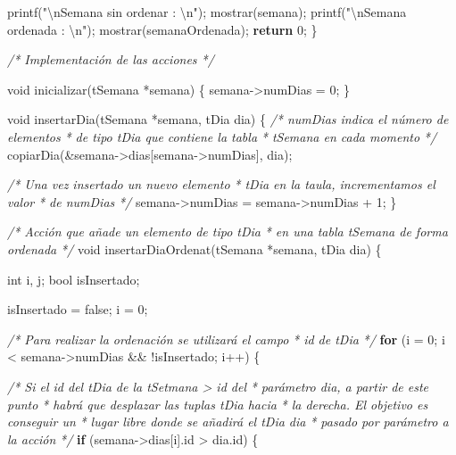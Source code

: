 \documentclass[
]{book}
\newenvironment{Shaded}{\begin{snugshade}}{\end{snugshade}}
\newcommand{\CommentTok}[1]{\textcolor[rgb]{0.56,0.35,0.01}{\textit{#1}}}
\newcommand{\ControlFlowTok}[1]{\textcolor[rgb]{0.13,0.29,0.53}{\textbf{#1}}}
\newcommand{\DataTypeTok}[1]{\textcolor[rgb]{0.13,0.29,0.53}{#1}}
\newcommand{\DecValTok}[1]{\textcolor[rgb]{0.00,0.00,0.81}{#1}}
\newcommand{\NormalTok}[1]{#1}
\newcommand{\SpecialCharTok}[1]{\textcolor[rgb]{0.00,0.00,0.00}{#1}}
\newcommand{\StringTok}[1]{\textcolor[rgb]{0.31,0.60,0.02}{#1}}
\begin{document}
\begin{Shaded}
\begin{Highlighting}[]
\NormalTok{    printf(}\StringTok{"}\SpecialCharTok{\textbackslash{}n}\StringTok{Semana sin ordenar : }\SpecialCharTok{\textbackslash{}n}\StringTok{"}\NormalTok{);}
\NormalTok{    mostrar(semana);}
\NormalTok{    printf(}\StringTok{"}\SpecialCharTok{\textbackslash{}n}\StringTok{Semana ordenada : }\SpecialCharTok{\textbackslash{}n}\StringTok{"}\NormalTok{);}
\NormalTok{    mostrar(semanaOrdenada);}
    \ControlFlowTok{return} \DecValTok{0}\NormalTok{;}
\NormalTok{\}}

\CommentTok{/* Implementación de las acciones */}

\DataTypeTok{void}\NormalTok{ inicializar(tSemana *semana) \{}
\NormalTok{    semana{-}\textgreater{}numDias = }\DecValTok{0}\NormalTok{;}
\NormalTok{\}}

\DataTypeTok{void}\NormalTok{ insertarDia(tSemana *semana, tDia dia) \{}
    \CommentTok{/* numDias indica el número de elementos}
\CommentTok{     * de tipo tDia que contiene la tabla }
\CommentTok{     * tSemana en cada momento }
\CommentTok{     */}
\NormalTok{    copiarDia(\&semana{-}\textgreater{}dias[semana{-}\textgreater{}numDias], dia);}

    \CommentTok{/* Una vez insertado un nuevo elemento}
\CommentTok{     * tDia en la taula, incrementamos el valor }
\CommentTok{     * de numDias }
\CommentTok{     */}
\NormalTok{    semana{-}\textgreater{}numDias = semana{-}\textgreater{}numDias + }\DecValTok{1}\NormalTok{;}
\NormalTok{\}}

\CommentTok{/* Acción que añade un elemento de tipo tDia}
\CommentTok{ * en una tabla tSemana de forma ordenada }
\CommentTok{ */}
\DataTypeTok{void}\NormalTok{ insertarDiaOrdenat(tSemana *semana, tDia dia) \{}
    
    \DataTypeTok{int}\NormalTok{ i, j;}
    \DataTypeTok{bool}\NormalTok{ isInsertado;}
    
\NormalTok{    isInsertado = false;}
\NormalTok{    i = }\DecValTok{0}\NormalTok{;}
    
    \CommentTok{/* Para realizar la ordenación se utilizará el campo}
\CommentTok{     * id de tDia }
\CommentTok{     */}
    \ControlFlowTok{for}\NormalTok{ (i = }\DecValTok{0}\NormalTok{; i \textless{} semana{-}\textgreater{}numDias \&\& !isInsertado; i++) \{}
        
        \CommentTok{/* Si el id del tDia de la tSetmana \textgreater{} id del}
\CommentTok{         * parámetro dia, a partir de este punto}
\CommentTok{         * habrá que desplazar las tuplas tDia hacia}
\CommentTok{         * la derecha. El objetivo es conseguir un}
\CommentTok{         * lugar libre donde se añadirá el tDia dia}
\CommentTok{         * pasado por parámetro a la acción}
\CommentTok{         */}
        \ControlFlowTok{if}\NormalTok{ (semana{-}\textgreater{}dias[i].id \textgreater{} dia.id) \{}
            

\end{Highlighting}
\end{Shaded}
\end{document}
